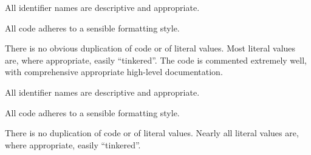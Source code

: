 \documentclass{../../../fal_assignment}
\begin{document}
\begin{markingrubric}
            \par All identifier names are descriptive and appropriate.
            \par All code adheres to a sensible formatting style.
             \par There is no obvious duplication of code or of literal values. Most literal values are, where appropriate, easily ``tinkered''.  
        \grade The code is commented extremely well, with comprehensive appropriate high-level documentation.
            \par All identifier names are descriptive and appropriate.
            \par All code adheres to a sensible formatting style.
            \par There is no duplication of code or of literal values. Nearly all literal values are, where appropriate, easily ``tinkered''.  
\end{markingrubric}
\end{document}
